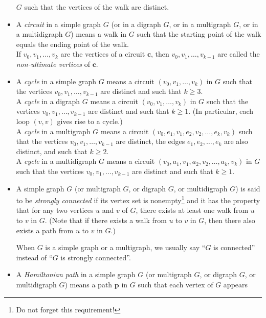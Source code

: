 \documentclass[numbers=enddot,12pt,final,onecolumn,notitlepage]{scrartcl}%
\theoremstyle{definition}
\newcommand{\tup}[1]{\left( #1 \right)}
\begin{document}
\begin{itemize}
      $G$ such that the vertices of the walk are distinct.
\item A \textit{circuit} in a simple graph $G$ (or in a digraph $G$,
      or in a multigraph $G$, or in a multidigraph $G$) means a walk
      in $G$ such that the starting point of the walk equals the
      ending point of the walk. \\
      If $v_0, v_1, \ldots, v_k$ are the vertices of a circuit
      $\mathbf{c}$, then $v_0, v_1, \ldots, v_{k-1}$ are called the
      \textit{non-ultimate vertices} of $\mathbf{c}$.
\item A \textit{cycle} in a simple graph $G$ means a circuit
      $\tup{v_0, v_1, \ldots, v_k}$ in $G$ such that the vertices
      $v_0, v_1, \ldots, v_{k-1}$ are distinct and such that
      $k \geq 3$. \\
      A \textit{cycle} in a digraph $G$ means a circuit
      $\tup{v_0, v_1, \ldots, v_k}$ in $G$ such that the vertices
      $v_0, v_1, \ldots, v_{k-1}$ are distinct and such that
      $k \geq 1$. (In particular, each loop $\tup{v, v}$ gives rise to
      a cycle.) \\
      A \textit{cycle} in a multigraph $G$ means a circuit
      $\tup{v_0, e_1, v_1, e_2, v_2, \ldots, e_k, v_k}$ such that the
      vertices $v_0, v_1, \ldots, v_{k-1}$ are distinct, the edges
      $e_1, e_2, \ldots, e_k$ are also distinct, and such that
      $k \geq 2$. \\
      A \textit{cycle} in a multidigraph $G$ means a circuit
      $\tup{v_0, a_1, v_1, a_2, v_2, \ldots, a_k, v_k}$ in $G$ such
      that the vertices $v_0, v_1, \ldots, v_{k-1}$ are distinct and
      such that $k \geq 1$.
\item A simple graph $G$ (or multigraph $G$, or digraph $G$, or
      multidigraph $G$) is said to be \textit{strongly connected} if
      its vertex set is nonempty\footnote{Do not forget this
      requirement!} and it has the property that for any two vertices
      $u$ and $v$ of $G$, there exists at least one walk from $u$ to
      $v$ in $G$. (Note that if there exists a walk from $u$ to $v$ in
      $G$, then there also exists a path from $u$ to $v$ in $G$.)
      \par
      When $G$ is a simple graph or a multigraph, we usually say
      ``$G$ is connected'' instead of ``$G$ is strongly connected''.
\item A \textit{Hamiltonian path} in a simple graph $G$ (or multigraph
      $G$, or digraph $G$, or multidigraph $G$) means a path
      $\mathbf{p}$ in $G$ such that each vertex of $G$ appears

\end{itemize}
\end{document}

